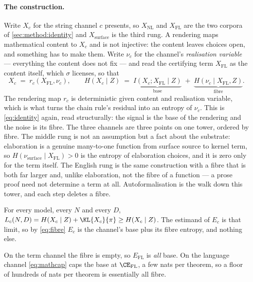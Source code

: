 \paragraph{The construction.}
Write \(X_c\) for the string channel \(c\) presents, so \(X_{\mathrm{NL}}\) and
\(X_{\mathrm{FL}}\) are the two corpora of \cref{sec:method:identity} and
\(X_{\mathrm{surface}}\) is the third rung.
A rendering maps mathematical content to \(X_c\) and is not injective:
the content leaves choices open, and something has to make them.
Write \(\nu_c\) for the channel's \emph{realisation variable} --- everything the
content does not fix --- and read the certifying term \(X_{\mathrm{FL}}\) as the
content itself, which \(\sigma\) licenses, so that
\begin{equation}
\label{eq:fibre}
  X_c \;=\; r_c(X_{\mathrm{FL}}, \nu_c),
  \qquad
  H(X_c \mid Z) \;=\; \underbrace{I(X_c; X_{\mathrm{FL}} \mid Z)}_{\text{base}}
  \;+\; \underbrace{H(\nu_c \mid X_{\mathrm{FL}}, Z)}_{\text{fibre}}.
\end{equation}
The rendering map \(r_c\) is deterministic given content and realisation
variable, which is what turns the chain rule's residual into an entropy of
\(\nu_c\).
This is \cref{eq:identity} again, read structurally:
the signal is the base of the rendering and the noise is its fibre.
The three channels are three points on one tower, ordered by fibre.
The middle rung is not an assumption but a fact about the substrate:
elaboration is a genuine many-to-one function from surface source to kernel
term, so \(H(\nu_{\mathrm{surface}}\mid X_{\mathrm{FL}}) > 0\) is the entropy of
elaboration choices, and it is zero only for the term itself.
The English rung is the same construction with a fibre that is both far larger
and, unlike elaboration, not the fibre of a function --- a prose proof need not
determine a term at all.
Autoformalisation is the walk down this tower, and each step deletes a fibre.

\begin{proposition}
\label{prop:floor}
For every model, every \(N\) and every \(D\),
\(L_c(N,D) = H(X_c\mid Z) + \KL{X_c}{\pi} \ge H(X_c \mid Z)\).
The estimand of \(E_c\) is that limit, so by \cref{eq:fibre}
\(E_c\) is the channel's base plus its fibre entropy, and nothing else.
\end{proposition}

On the term channel the fibre is empty, so \(E_{\mathrm{FL}}\) is \emph{all}
base.
On the language channel \cref{eq:mathcap} caps the base at
\(\CE_{\mathrm{FL}}\), a few nats per theorem, so a floor of hundreds of nats
per theorem is essentially all fibre.


